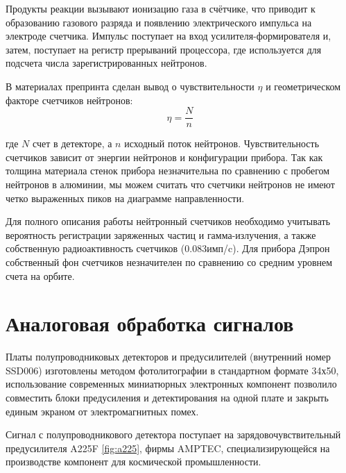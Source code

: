 Продукты реакции вызывают ионизацию газа в счётчике, что приводит к образованию газового разряда и появлению электрического импульса на электроде счетчика. Импульс поступает на вход усилителя-формирователя и, затем, поступает на регистр прерываний процессора, где используется для подсчета числа зарегистрированных нейтронов.
\cite{Shavrin2002}

В материалах препринта \cite{Shavrin1990} сделан вывод о чувствительности $ \eta $ и геометрическом факторе счетчиков нейтронов: 
\begin{equation}\label{eq:sens}
 \eta = \frac{N}{n} 
\end{equation}

где $ N $ счет в детекторе, а $ n $ исходный поток нейтронов. Чувствительность счетчиков зависит от энергии нейтронов и конфигурации прибора. Так как толщина материала стенок прибора незначительна по сравнению с пробегом нейтронов в алюминии, мы можем считать что счетчики нейтронов не имеют четко выраженных пиков на диаграмме направленности.

Для полного описания работы нейтронный счетчиков необходимо учитывать вероятность регистрации заряженных частиц и гамма-излучения, а также собственную радиоактивность счетчиков (0.083имп/c). Для прибора Дэпрон собственный фон счетчиков незначителен по сравнению со средним уровнем счета на орбите. 

\section{Аналоговая обработка сигналов}

Платы полупроводниковых детекторов и предусилителей (внутренний номер SSD006) изготовлены методом фотолитографии в стандартном формате 34х50, использование современных миниатюрных электронных компонент позволило совместить блоки предусиления и детектирования на одной плате и закрыть единым экраном от электромагнитных помех.

	Сигнал с полупроводникового детектора поступает на зарядовочувствительный предусилителя A225F \ref{fig:a225}, фирмы AMPTEC, специализирующейся на производстве компонент для космической промышленности. 


